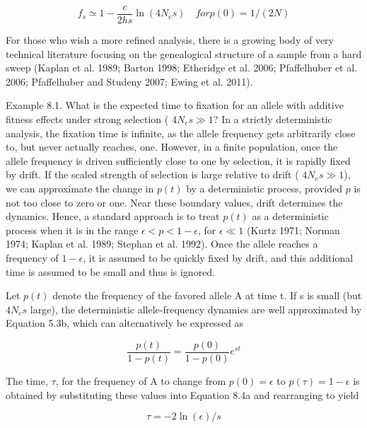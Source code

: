 \documentclass{article}
\begin{document}
\begin{equation}
f_{s}\simeq1-\frac{c}{2h s}\ln(4N_{e}s)\quad for p(0)=1/(2N)
\tag{8.3g}
\label{eq:8_3g}
\end{equation}

For those who wish a more refined analysis, there is a growing body of very technical literature focusing on the genealogical structure of a sample from a hard sweep (Kaplan et al. 1989; Barton 1998; Etheridge et al. 2006; Pfaffelhuber et al. 2006; Pfaffelhuber and Studeny 2007; Ewing et al. 2011).

Example 8.1. What is the expected time to fixation for an allele with additive fitness effects under strong selection ( $ 4N_{e}s \gg 1 $? In a strictly deterministic analysis, the fixation time is infinite, as the allele frequency gets arbitrarily close to, but never actually reaches, one. However, in a finite population, once the allele frequency is driven sufficiently close to one by selection, it is rapidly fixed by drift. If the scaled strength of selection is large relative to drift ( $ 4N_{e}s \gg 1 $), we can approximate the change in  $ p(t) $ by a deterministic process, provided  $ p $ is not too close to zero or one. Near these boundary values, drift determines the dynamics. Hence, a standard approach is to treat  $ p(t) $ as a deterministic process when it is in the range  $ \epsilon < p < 1 - \epsilon $, for  $ \epsilon \ll 1 $ (Kurtz 1971; Norman 1974; Kaplan et al. 1989; Stephan et al. 1992). Once the allele reaches a frequency of  $ 1 - \epsilon $, it is assumed to be quickly fixed by drift, and this additional time is assumed to be small and thus is ignored.

Let  $ p(t) $ denote the frequency of the favored allele A at time t. If s is small (but  $ 4N_{e}s $ large), the deterministic allele-frequency dynamics are well approximated by Equation 5.3b, which can alternatively be expressed as

\begin{equation}
\frac{p(t)}{1-p(t)}=\frac{p(0)}{1-p(0)}e^{st}
\tag{8.4a}
\label{eq:8_4a}
\end{equation}

The time,  $ \tau $, for the frequency of A to change from  $ p(0) = \epsilon $ to  $ p(\tau) = 1 - \epsilon $ is obtained by substituting these values into Equation 8.4a and rearranging to yield

\begin{equation}
\tau=-2\ln(\epsilon)/s
\tag{8.4b}
\label{eq:8_4b}
\end{equation}
\end{document}
